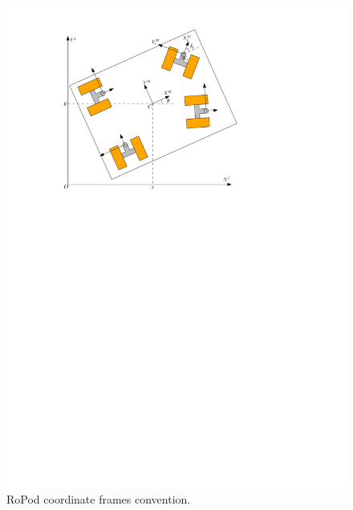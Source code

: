 \documentclass{article}
\begin{document}
	\begin{figure}[h]
		\centering
		\includegraphics[]{Ropod.pdf}
		\caption{RoPod coordinate frames convention.}
		\label{fig:Ropod_coordinates}
	\end{figure}
	


    
\end{document}
